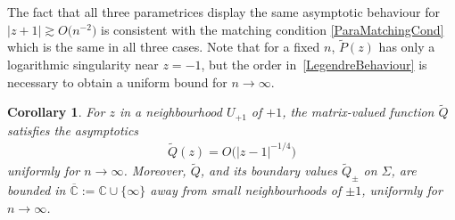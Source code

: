 \documentclass[11pt]{article}
\numberwithin{equation}{section}
\newcommand{\C}{\mathbb{C}}
\newcommand{\tQ}{{\widetilde Q}}
\newcommand{\tP}{{\widetilde P}}
\newtheorem{Corollary}[Theorem]{Corollary}
\numberwithin{equation}{section}
\begin{document}
The fact that all three parametrices display the same asymptotic behaviour for $|z+1|\gtrsim O\big(n^{-2}\big)$ is consistent with the matching condition \eqref{ParaMatchingCond} which is the same in all three cases. Note that for a fixed $n$, $\tP(z)$ has only a logarithmic singularity near $z = -1$, but the order in~\eqref{LegendreBehaviour} is necessary to obtain a uniform bound for $n\to\infty$.
\begin{Corollary}
For $z$ in a neighbourhood $U_{+1}$ of $+1$, the matrix-valued function $\tQ$ satisfies the asymptotics
\begin{align}\label{LegendreQBehaviour}
 \tQ(z) = O\big(|z-1|^{-1/4}\big)
\end{align}
uniformly for $n\to\infty$. Moreover, $\tQ$, and its boundary values $\tQ_\pm$ on $\Sigma$, are bounded in $\overline{\C} := \C \cup \lbrace \infty \rbrace$ away from small neighbourhoods of $\pm 1$, uniformly for $n\to\infty$.
\end{Corollary}
\end{document}

